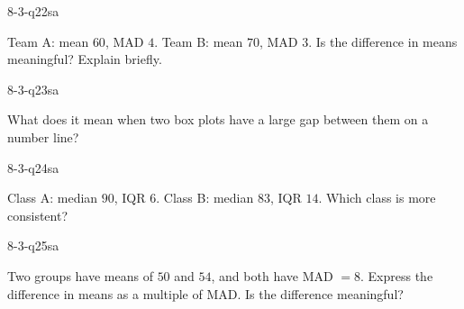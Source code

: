 \begin{practiceQuestion}{8-3-q22}{sa}
\begin{questionText}
Team A: mean $60$, MAD $4$. Team B: mean $70$, MAD $3$. Is the difference in means meaningful? Explain briefly.
\end{questionText}
\end{practiceQuestion}

\begin{practiceQuestion}{8-3-q23}{sa}
\begin{questionText}
What does it mean when two box plots have a large gap between them on a number line?
\end{questionText}
\end{practiceQuestion}

\begin{practiceQuestion}{8-3-q24}{sa}
\begin{questionText}
Class A: median $90$, IQR $6$. Class B: median $83$, IQR $14$. Which class is more consistent?
\end{questionText}
\end{practiceQuestion}

\begin{practiceQuestion}{8-3-q25}{sa}
\begin{questionText}
Two groups have means of $50$ and $54$, and both have MAD $= 8$. Express the difference in means as a multiple of MAD. Is the difference meaningful?
\end{questionText}
\end{practiceQuestion}


